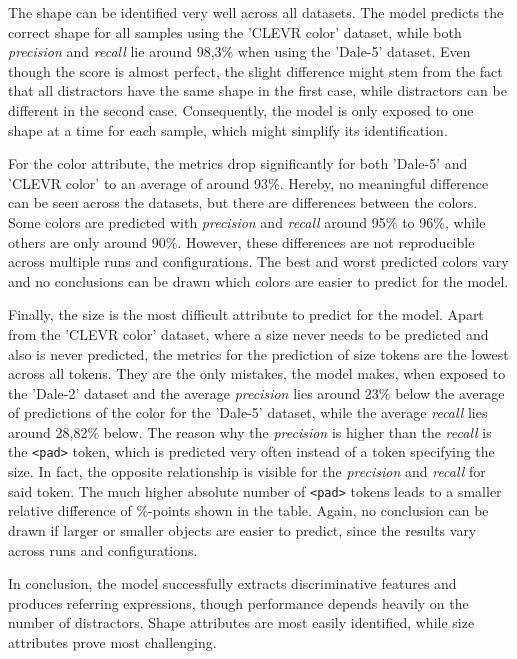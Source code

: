 \documentclass[11pt,a4paper]{article}
\begin{document}
The shape can be identified very well across all datasets.
The model predicts the correct shape for all samples using the 'CLEVR color' dataset, while both \emph{precision} and \emph{recall} lie around 98,3\% when using the 'Dale-5' dataset.
Even though the score is almost perfect, the slight difference might stem from the fact that all distractors have the same shape in the first case, while distractors can be different in the second case.
Consequently, the model is only exposed to one shape at a time for each sample, which might simplify its identification.

For the color attribute, the metrics drop significantly for both 'Dale-5' and 'CLEVR color' to an average of around 93\%.
Hereby, no meaningful difference can be seen across the datasets, but there are differences between the colors.
Some colors are predicted with \emph{precision} and \emph{recall} around 95\% to 96\%, while others are only around 90\%.
However, these differences are not reproducible across multiple runs and configurations.
The best and worst predicted colors vary and no conclusions can be drawn which colors are easier to predict for the model.

Finally, the size is the most difficult attribute to predict for the model.
Apart from the 'CLEVR color' dataset, where a size never needs to be predicted and also is never predicted, the metrics for the prediction of size tokens are the lowest across all tokens.
They are the only mistakes, the model makes, when exposed to the 'Dale-2' dataset and the average \emph{precision} lies around 23\% below the average of predictions of the color for the 'Dale-5' dataset, while the average \emph{recall} lies around 28,82\% below.
The reason why the \emph{precision} is higher than the \emph{recall} is the \texttt{<pad>} token, which is predicted very often instead of a token specifying the size.
In fact, the opposite relationship is visible for the \emph{precision} and \emph{recall} for said token.
The much higher absolute number of \texttt{<pad>} tokens leads to a smaller relative difference of \%-points shown in the table.
Again, no conclusion can be drawn if larger or smaller objects are easier to predict, since the results vary across runs and configurations.

In conclusion, the model successfully extracts discriminative features and produces referring expressions, though performance depends heavily on the number of distractors. Shape attributes are most easily identified, while size attributes prove most challenging.
\end{document}
